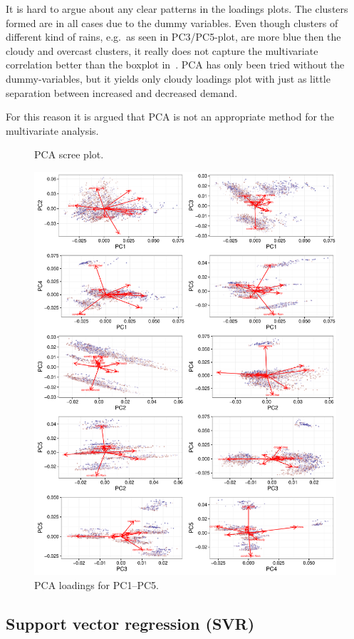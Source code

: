 It is hard to argue about any clear patterns in the loadings plots. The clusters formed are in all cases due to the dummy variables. Even though clusters of different kind of rains, e.g.\ as seen in PC3/PC5-plot, are more blue then the cloudy and overcast clusters, it really does not capture the multivariate correlation better than the boxplot in~. PCA has only been tried without the dummy-variables, but it yields only cloudy loadings plot with just as little separation between increased and decreased demand.

For this reason it is argued that PCA is not an appropriate method for the multivariate analysis.
\begin{figure}[!ht]
    \center
    
    \caption{PCA scree plot.}
    \label{fig:pca_screeplot}
\end{figure}

\begin{figure}[!p]
    \center
    \includegraphics[width=\textwidth]{../plots/pca_loadings}
    \caption{PCA loadings for PC1--PC5.}
    \label{fig:pca_loadings}
\end{figure}
\clearpage

\subsection{Support vector regression (SVR)}